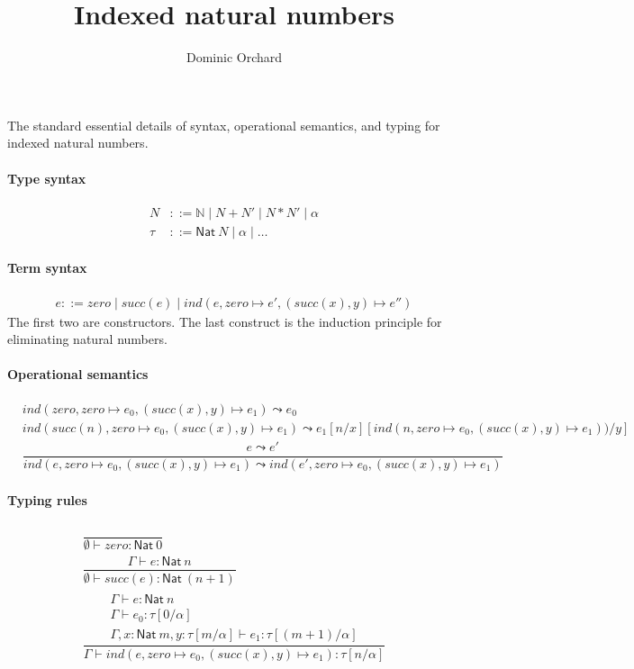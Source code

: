 \documentclass[10pt]{article}
\title{Indexed natural numbers}
\author{Dominic Orchard}
\begin{document}
\maketitle

The standard essential details of syntax, operational semantics, and typing for indexed natural numbers.

\paragraph{Type syntax}
\begin{align}
\tag{type-level naturals}
N & ::= \mathbb{N} \mid N + N' \mid N * N' \mid \alpha \\
\tag{types} 
\tau & ::= \mathsf{Nat}\ N \mid \alpha \mid \ldots 
\end{align}

\paragraph{Term syntax}
\begin{align*}
e ::= zero \mid succ(e) \mid ind(e, zero \mapsto e', (succ(x), y) \mapsto e'')
\end{align*}
The first two are constructors. The last construct is the induction principle for eliminating
natural numbers.

\paragraph{Operational semantics}
\begin{align*}
& ind(zero, zero \mapsto e_0, (succ(x),y) \mapsto e_1) \leadsto e_0
\\[2em]
& ind(succ(n), zero \mapsto e_0, (succ(x),y) \mapsto e_1) \leadsto e_1[n/x][ind(n,zero \mapsto e_0, (succ(x),y) \mapsto e_1))/y]
\\[2em]
& \dfrac{e \leadsto e'}{ind (e, zero \mapsto e_0, (succ(x),y) \mapsto e_1) \leadsto ind (e', zero \mapsto e_0, (succ(x),y) \mapsto e_1)}
\end{align*}

\paragraph{Typing rules}
\begin{align*}
\begin{array}{c}
\dfrac{}{\emptyset \vdash zero : \mathsf{Nat}\ 0}
\\[2em]
\dfrac{\Gamma \vdash e : \mathsf{Nat}\ n}{\emptyset \vdash succ(e) : \mathsf{Nat}\ (n+1)}
\\[2em]
\dfrac{\begin{array}{l}
       \Gamma \vdash e : \mathsf{Nat}\ n \\ \Gamma \vdash e_0 : \tau[0/\alpha] \\
        \Gamma, x : \mathsf{Nat}\ m, y : \tau[m/\alpha] \vdash e_1 : \tau[(m+1)/\alpha]\end{array}}
      {\Gamma \vdash ind (e, zero \mapsto e_0, (succ(x),y) \mapsto e_1) : \tau[n/\alpha] }
\end{array}
\end{align*}
\end{document}
